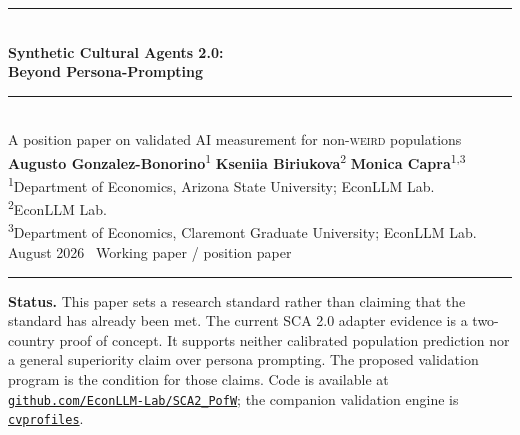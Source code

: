 \documentclass[10pt,letterpaper]{article}
\newcommand{\WEIRD}{\textsc{weird}}
\begin{document}
\thispagestyle{empty}
\begin{center}
\vspace*{1.3cm}
{\color{econblue}\rule{\textwidth}{1.15pt}}\\[0.45em]
{\LARGE\bfseries\color{econblue} Synthetic Cultural Agents 2.0:}\\[0.16em]
{\LARGE\bfseries\color{econblue} Beyond Persona-Prompting}\\[0.45em]
{\color{econblue}\rule{\textwidth}{0.55pt}}\\[0.85em]
{\large A position paper on validated AI measurement for non-\WEIRD{} populations}\\[1.0em]
{\large\textbf{Augusto Gonzalez-Bonorino}\textsuperscript{1}\quad
\textbf{Kseniia Biriukova}\textsuperscript{2}\quad
\textbf{Monica Capra}\textsuperscript{1,3}}\\[0.5em]
{\small\textsuperscript{1}Department of Economics, Arizona State University; EconLLM Lab.\\
\textsuperscript{2}EconLLM Lab.\\
\textsuperscript{3}Department of Economics, Claremont Graduate University; EconLLM Lab.}\\[0.8em]
{\normalsize August 2026 \textperiodcentered\ Working paper / position paper}\\[0.4em]
{\color{econblue}\rule{0.28\textwidth}{0.35pt}}
\end{center}

\vfill
\noindent\colorbox{mist}{\parbox{0.965\textwidth}{\small\vspace{0.25em}
\textbf{Status.} This paper sets a research standard rather than claiming that the standard has already been met. The current SCA 2.0 adapter evidence is a two-country proof of concept. It supports neither calibrated population prediction nor a general superiority claim over persona prompting. The proposed validation program is the condition for those claims. Code is available at \href{https://github.com/EconLLM-Lab/SCA2_PofW}{\texttt{github.com/EconLLM-Lab/SCA2\_PofW}}; the companion validation engine is \href{https://github.com/Bonorinoa/cvprofiles}{\texttt{cvprofiles}}.\vspace{0.25em}}}
\newpage
\end{document}
